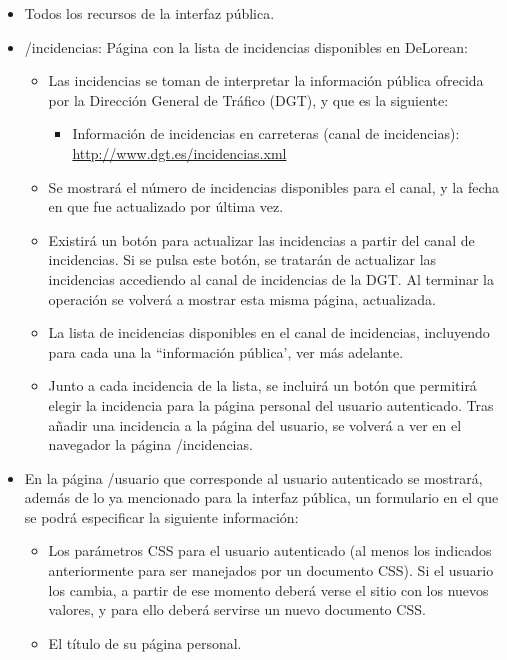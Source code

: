 \begin{itemize}
\item Todos los recursos de la interfaz pública.
\item /incidencias: Página con la lista de incidencias disponibles en DeLorean:

  \begin{itemize}
  \item Las incidencias se toman de interpretar la información pública ofrecida por la Dirección General de Tráfico (DGT), y que es la siguiente:
    \begin{itemize}
      \item Información de incidencias en carreteras (canal de incidencias): \\
        \url{http://www.dgt.es/incidencias.xml}
    \end{itemize}

  \item Se mostrará el número de incidencias disponibles para el canal, y la fecha en que fue actualizado por última vez.
  \item Existirá un botón para actualizar las incidencias a partir del canal de incidencias. Si se pulsa este botón, se tratarán de actualizar las incidencias accediendo al canal de incidencias de la DGT. Al terminar la operación se volverá a mostrar esta misma página, actualizada.
  \item La lista de incidencias disponibles en el canal de incidencias, incluyendo para cada una la ``información pública', ver más adelante.
  \item Junto a cada incidencia de la lista, se incluirá un botón que permitirá elegir la incidencia para la página personal del usuario autenticado. Tras añadir una incidencia a la página del usuario, se volverá a ver en el navegador la página /incidencias.
  \end{itemize}

\item En la página /usuario que corresponde al usuario autenticado se mostrará, además de lo ya mencionado para la interfaz pública, un formulario en el que se podrá especificar la siguiente información:

  \begin{itemize}
  \item Los parámetros CSS para el usuario autenticado (al menos los indicados anteriormente para ser manejados por un documento CSS). Si el usuario los cambia, a partir de ese momento deberá verse el sitio con los nuevos valores, y para ello deberá servirse un nuevo documento CSS.
  \item El título de su página personal.
  \end{itemize}
\end{itemize}

